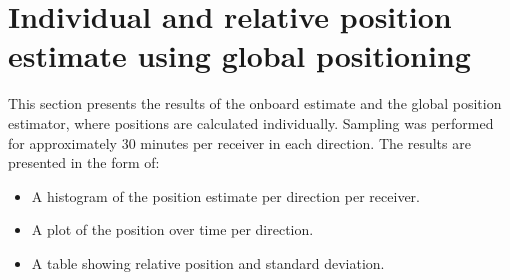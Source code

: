 \section{Individual and relative position estimate using global positioning}
This section presents the results of the onboard estimate and the global position estimator, where positions are calculated individually. Sampling was performed for approximately 30 minutes per receiver in each direction. The results are presented in the form of:
\begin{itemize}
\item A histogram of the position estimate per direction per receiver.
\item A plot of the position over time per direction.
\item A table showing relative position and standard deviation.
\end{itemize}
